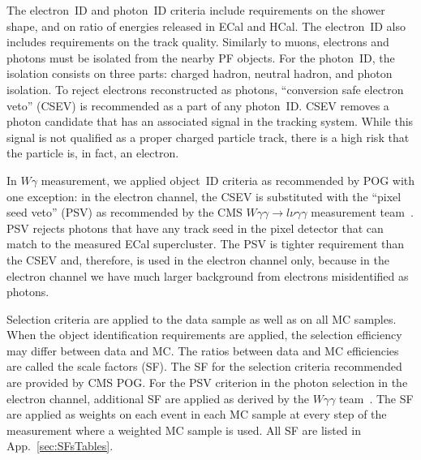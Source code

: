The electron~ID and photon~ID criteria include requirements on the shower shape, and on ratio of energies released in ECal and HCal. The electron~ID also includes requirements on the track quality. Similarly to muons, electrons and photons must be isolated from the nearby PF objects. For the photon~ID, the isolation consists on three parts: charged hadron, neutral hadron, and photon isolation. To reject electrons reconstructed as photons, ``conversion safe electron veto'' (CSEV) is recommended as a part of any photon~ID. CSEV removes a photon candidate that has an associated signal in the tracking system. While this signal is not qualified as a proper charged particle track, there is a high risk that the particle is, in fact, an electron.



In $W\gamma$ measurement, we applied object~ID criteria as recommended by POG with one exception: in the electron channel, the CSEV is substituted with the ``pixel seed veto'' (PSV) as recommended by the CMS $W\gamma\gamma \rightarrow l\nu\gamma\gamma$ measurement team~\cite{ref_Wgg8TeV}. PSV rejects photons that have any track seed in the pixel detector that can match to the measured ECal supercluster. The PSV is tighter requirement than the CSEV and, therefore, is used in the electron channel only, because in the electron channel we have much larger background from electrons misidentified as photons. %

Selection criteria are applied to the data sample as well as on all MC samples. When the object identification requirements are applied, the selection efficiency may differ between data and MC. The ratios between data and MC efficiencies are called the scale factors (SF). The SF for the selection criteria recommended are provided by CMS POG. For the PSV criterion in the photon selection in the electron channel, additional SF are applied as derived by the $W\gamma\gamma$ team~\cite{ref_Wgg8TeV}. The SF are applied as weights on each event in each MC sample at every step of the measurement where a weighted MC sample is used. All SF are listed in App.~\ref{sec:SFsTables}.

